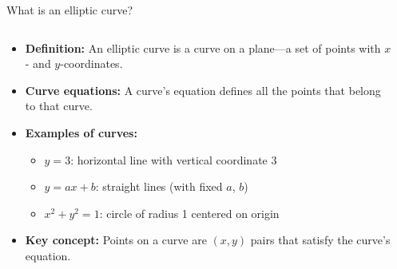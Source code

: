 \documentclass[aspectratio=169, lualatex, handout]{beamer}
\begin{document}
\begin{frame}{What is an elliptic curve?}
	\begin{columns}
		\begin{column}{0.6\textwidth}
			\begin{itemize}
				\item \textbf{Definition:} An elliptic curve is a curve on a plane—a set of points with $x$- and $y$-coordinates.
				\item \textbf{Curve equations:} A curve's equation defines all the points that belong to that curve.
				\item \textbf{Examples of curves:}
				      \begin{itemize}
					      \item $y = 3$: horizontal line with vertical coordinate 3
					      \item $y = ax + b$: straight lines (with fixed $a$, $b$)
					      \item $x^2 + y^2 = 1$: circle of radius 1 centered on origin
				      \end{itemize}
				\item \textbf{Key concept:} Points on a curve are $(x, y)$ pairs that satisfy the curve's equation.
			\end{itemize}
		\end{column}
		\begin{column}{0.4\textwidth}
		\end{column}
	\end{columns}
\end{frame}
\end{document}
